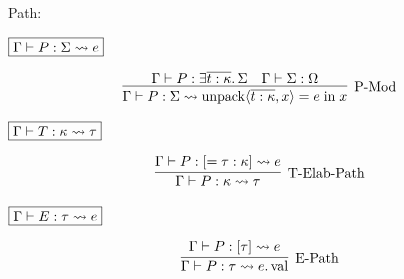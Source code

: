 Path:

$\fbox{$\Gamma \vdash P: \Sigma \rightsquigarrow e$}$

\begin{gather*}
  \infer[\text{P-Mod}]{\Gamma \vdash P: \Sigma \elaborate \symunpack\langle \overline{t: \kappa}, x\rangle = e \symin x}{
    \Gamma \vdash P: \exists \overline{t: \kappa}\ldotp \Sigma
    &
    \Gamma \vdash \Sigma: \Omega
  }
\end{gather*}

$\fbox{$\Gamma \vdash T: \kappa \rightsquigarrow \tau$}$

\begin{gather*}
  \infer[\text{T-Elab-Path}]{\Gamma \vdash P: \kappa \elaborate \tau}{
    \Gamma \vdash P: [= \tau: \kappa] \elaborate e
  }
\end{gather*}

$\fbox{$\Gamma \vdash E: \tau \rightsquigarrow e$}$

\begin{gather*}
  \infer[\text{E-Path}]{\Gamma \vdash P: \tau \elaborate e.\symval}{
    \Gamma \vdash P: [\tau] \elaborate e
  }
\end{gather*}
